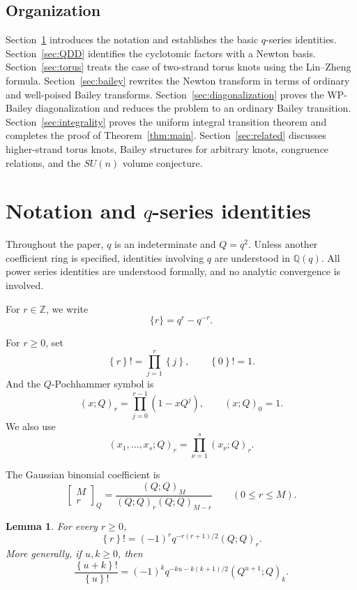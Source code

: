 \documentclass[11pt]{amsart}
\newtheorem{lemma}[theorem]{Lemma}
\newcommand{\Q}{\mathbb Q}
\newcommand{\curly}[1]{\left\{#1\right\}}
\newcommand{\Gauss}[2]{\begin{bmatrix}#1\\#2\end{bmatrix}_{Q}}
\begin{document}
\subsection{Organization}
Section~\ref{sec:preliminaries} introduces the notation and establishes the basic \(q\)-series identities.
Section~\ref{sec:QDD} identifies the cyclotomic factors with a Newton basis.
Section~\ref{sec:torus} treats the case of two-strand torus knots using the Lin--Zheng formula.
Section~\ref{sec:bailey} rewrites the Newton transform in terms of ordinary and well-poised Bailey transforms.
Section~\ref{sec:diagonalization} proves the WP-Bailey diagonalization and reduces the problem to an ordinary Bailey transition.
Section~\ref{sec:integrality} proves the uniform integral transition theorem and completes the proof of Theorem~\ref{thm:main}.
Section~\ref{sec:related} discusses higher-strand torus knots, Bailey structures for arbitrary knots, congruence relations, and the \(SU(n)\) volume conjecture.

\section{Notation and \(q\)-series identities}
\label{sec:preliminaries}

Throughout the paper, \(q\) is an indeterminate and \(Q=q^2\).
Unless another coefficient ring is specified, identities involving
\(q\) are understood in \(\Q(q)\).  All power series identities are understood formally, and no analytic
convergence is involved.

For \(r\in\mathbb Z\), we write
\[
\{r\}=q^r-q^{-r}.
\]

For \(r\geq0\), set
\[
\curly{r}!
=
\prod_{j=1}^{r}\curly{j},
\qquad
\curly{0}!=1.
\]
And the \(Q\)-Pochhammer symbol is
\[
(x;Q)_r
=
\prod_{j=0}^{r-1}(1-xQ^j),
\qquad
(x;Q)_0=1.
\]
We also use
\[
(x_1,\ldots,x_s;Q)_r
=
\prod_{\nu=1}^{s}(x_\nu;Q)_r.
\]

The Gaussian binomial coefficient is
\[
\Gauss{M}{r}
=
\frac{(Q;Q)_M}
{(Q;Q)_r(Q;Q)_{M-r}}
\qquad
(0\leq r\leq M).
\]

\begin{lemma}\label{lem:q-factorial-conversion}
For every \(r\geq0\),
\begin{equation}\label{eq:q-factorial-conversion}
\curly{r}!
=
(-1)^r
q^{-r(r+1)/2}
(Q;Q)_r.
\end{equation}
More generally, if \(u,k\geq0\), then
\begin{equation}\label{eq:factorial-ratio}
\frac{\curly{u+k}!}{\curly{u}!}
=
(-1)^k
q^{-ku-k(k+1)/2}
(Q^{u+1};Q)_k.
\end{equation}
\end{lemma}
\end{document}
